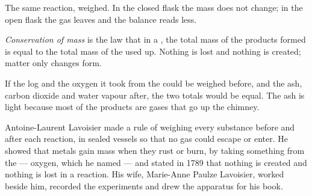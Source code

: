 \begin{omfigure}

{\small The same reaction, weighed. In the closed flask the mass does
not change; in the open flask the gas leaves and the balance reads
less.}
\end{omfigure}

\begin{definition}\label{def:g8:balanced-equations:conservation}
\emph{Conservation of mass} is the law that
in a , the total mass of the products formed is equal
to the total mass of the  used up. Nothing is lost and nothing
is created; matter only changes form.
\end{definition}

\begin{example}\label{ex:g8:balanced-equations:log}
If the  log and the oxygen it took from the  could be weighed
before, and the ash, carbon dioxide and water vapour after, the two
totals would be equal. The ash is light because most of the products
are gases that go up the chimney.
\end{example}

\begin{history}
Antoine-Laurent Lavoisier made a rule of weighing
every substance before and after each reaction, in sealed vessels so
that no gas could escape or enter. He showed that metals gain mass when
they rust or burn, by taking something from the  --- oxygen, which
he named --- and stated in 1789 that nothing is created and nothing is
lost in a reaction. His wife, Marie-Anne Paulze Lavoisier, worked beside
him, recorded the experiments and drew the apparatus for his book.
\end{history}

